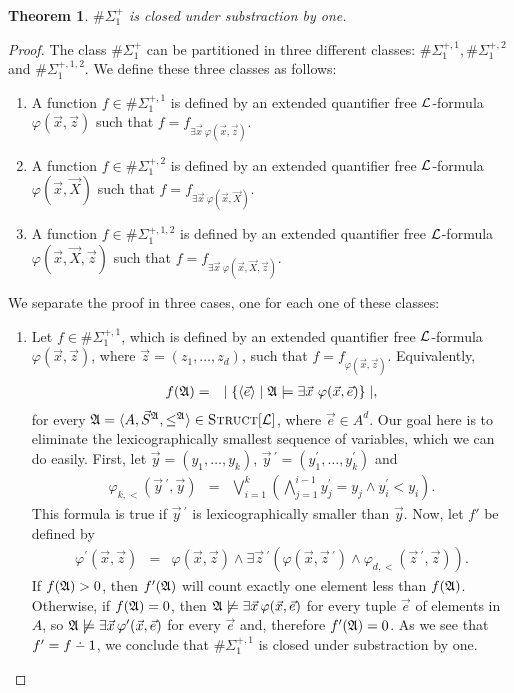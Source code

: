 \documentclass[12pt]{article}
\def\dotminus{\mathbin{\ooalign{\hss\raise1ex\hbox{.}\hss\cr
  \mathsurround=0pt$-$}}}
\def\E1{\#\Sigma_1^{+}}
\def\Ea{\#\Sigma_1^{+,1}}
\def\Eb{\#\Sigma_1^{+,2}}
\def\Ec{\#\Sigma_1^{+,1,2}}
\def\Truc{\textsc{Struct}[\L]}
\def\A{{\frak A}}
\def\L{{\cal L}}
\def\S{\vec{S}}
\def\X{\vec{X}}
\def\e{\vec{e}} %
\def\x{\vec{x}} %
\def\y{\vec{y}} %
\def\z{\vec{z}} %
\newtheorem{theo}{Theorem}
\begin{document}
\begin{theo}
$\E1$ is closed under substraction by one.
\end{theo}
\begin{proof}
The class $\E1$ can be partitioned in three different classes:  $\Ea, \Eb$ and $\Ec.$ We define these three classes as follows:
\begin{enumerate}
\item A function $f \in \Ea$ is defined by an extended quantifier free $\L$-formula $\varphi(\x,\z)$ such that $f = f_{\exists \x \: \varphi(\x,\z)}.$
\item A function $f \in \Eb$ is defined by an extended quantifier free $\L$-formula $\varphi(\x,\X)$ such that $f = f_{\exists \x \: \varphi(\x,\X)}.$
\item A function $f \in \Ec$ is defined by an extended quantifier free $\L$-formula $\varphi(\x,\X,\z)$ such that $f = f_{\exists \x \: \varphi(\x,\X,\z)}.$
\end{enumerate}
We separate the proof in three cases, one for each one of these classes:
\begin{enumerate}


\item Let $f \in \Ea$, which is defined by an extended quantifier free $\L$-formula $\varphi(\x,\z)$, where $\z = (z_1,\dots,z_d)$, such that $f = f_{\varphi(\x,\z)}$. Equivalently,
\begin{eqnarray*}
f(\A) &=& \mid \{ \langle\e\rangle \mid \A \models \exists \x \ \varphi(\x,\e) \} \mid,
\end{eqnarray*}
for every $\A = \langle A, \S^{\A}, \leq^{\A} \rangle \in \Truc$, where $\e \in A^d$. Our goal here is to eliminate the lexicographically smallest sequence of variables, which we can do easily. First, let $\y = (y_1,\dots,y_k)$, $\y\,^\prime = (y_1^\prime,\dots,y_k^\prime)$ and
\begin{eqnarray*}
\varphi_{k,<}(\y\,^\prime,\y) &=& \bigvee_{i = 1}^k \left( \bigwedge_{j=1}^{i-1} y_j^\prime = y_j \wedge y_i^\prime < y_i \right).
\end{eqnarray*}
This formula is true if $\y\,^\prime$ is lexicographically smaller than $\y$. Now, let $f'$ be defined by
\begin{eqnarray*}
\varphi^\prime(\x,\z) &=& \varphi(\x,\z) \wedge \exists \z\,^\prime (\varphi(\x,\z\,^\prime) \wedge \varphi_{d,<}(\z\,^\prime,\z ) ).
\end{eqnarray*}
If $f(\A)>0$, then $f'(\A)$ will count exactly one element less than $f(\A)$. Otherwise, if $f(\A)=0$, then $\A \not\models\exists \x\,\varphi(\x,\e)$ for every tuple $\e$ of elements in $A$, so $\A \not\models\exists \x\,\varphi^\prime(\x,\e)$ for every $\e$ and, therefore $f'(\A)=0$. As we see that $f' = f\dotminus 1$, we conclude that $\Ea$ is closed under substraction by one.


\end{enumerate}
\end{proof}
\end{document}
